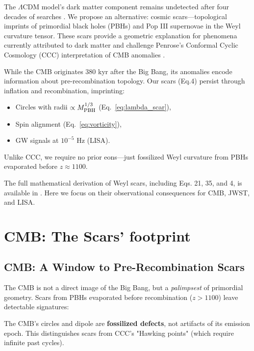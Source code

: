 \documentclass{article}
\begin{document}
The $\Lambda$CDM model's dark matter component remains undetected after four decades of searches \cite{XENONnT2023}. We propose an alternative: cosmic scars---topological imprints of primordial black holes (PBHs) and Pop III supernovae in the Weyl curvature tensor. These scars provide a geometric explanation for phenomena currently attributed to dark matter and challenge Penrose's Conformal Cyclic Cosmology (CCC) interpretation of CMB anomalies \cite{Planck2023}.\par
\vspace{0.5em}

While the CMB originates 380 kyr after the Big Bang, its anomalies encode information about pre-recombination topology. Our scars (Eq.4) persist through inflation and recombination, imprinting:
\begin{itemize}  
    \item Circles with radii $\propto M_{\rm PBH}^{1/3}$ (Eq.~\ref{eq:lambda_scar}),  
    \item Spin alignment (Eq.~\ref{eq:vorticity}),  
    \item GW signals at $10^{-5}$ Hz (LISA).  
\end{itemize}  \par
\vspace{0.5em}
Unlike CCC, we require no prior eons—just fossilized Weyl curvature from PBHs evaporated before $z \approx 1100$.  \par
\vspace{0.5em}

The full mathematical derivation of Weyl scars, including Eqs. 21, 35, and 4, is available in \cite{bertran2025cosmic}. Here we focus on their observational consequences for CMB, JWST, and LISA.

\section{CMB: The Scars' footprint}

\subsection{CMB: A Window to Pre-Recombination Scars}  
The CMB is not a direct image of the Big Bang, but a \textit{palimpsest} of primordial geometry.  
Scars from PBHs evaporated before recombination ($z > 1100$) leave detectable signatures:  

\begin{tcolorbox}[colback=boxnormal,colframe=blue!50!black,title=Key Insight]  
The CMB's circles and dipole are \textbf{fossilized defects}, not artifacts of its emission epoch.  
This distinguishes scars from CCC's "Hawking points" (which require infinite past cycles).  
\end{tcolorbox}  
\end{document}
